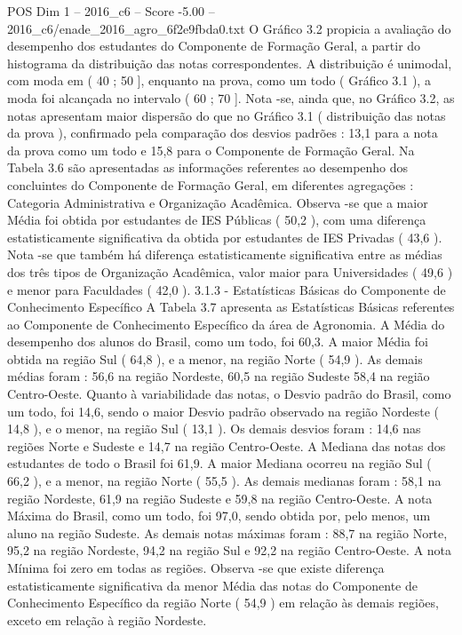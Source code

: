 \begin{textsample}{POS Dim 1 – 2016\_c6 – Score -5.00 – 2016\_c6/enade\_2016\_agro\_6f2e9fbda0.txt}
O Gráfico 3.2 propicia a avaliação do desempenho dos estudantes do Componente de Formação Geral, a partir do histograma da distribuição das notas correspondentes.
A distribuição é unimodal, com moda em ( 40 ; 50 ], enquanto na prova, como um todo ( Gráfico 3.1 ), a moda foi alcançada no intervalo ( 60 ; 70 ].
Nota -se, ainda que, no Gráfico 3.2, as notas apresentam maior dispersão do que no Gráfico 3.1 ( distribuição das notas da prova ), confirmado pela comparação dos desvios padrões : 13,1 para a nota da prova como um todo e 15,8 para o Componente de Formação Geral.
Na Tabela 3.6 são apresentadas as informações referentes ao desempenho dos concluintes do Componente de Formação Geral, em diferentes agregações : Categoria Administrativa e Organização Acadêmica.
Observa -se que a maior Média foi obtida por estudantes de IES Públicas ( 50,2 ), com uma diferença estatisticamente significativa da obtida por estudantes de IES Privadas ( 43,6 ).
Nota -se que também há diferença estatisticamente significativa entre as médias dos três tipos de Organização Acadêmica, valor maior para Universidades ( 49,6 ) e menor para Faculdades ( 42,0 ). 3.1.3 - Estatísticas Básicas do Componente de Conhecimento Específico A Tabela 3.7 apresenta as Estatísticas Básicas referentes ao Componente de Conhecimento Específico da área de Agronomia.
A Média do desempenho dos alunos do Brasil, como um todo, foi 60,3.
A maior Média foi obtida na região Sul ( 64,8 ), e a menor, na região Norte ( 54,9 ).
As demais médias foram : 56,6 na região Nordeste, 60,5 na região Sudeste 58,4 na região Centro-Oeste.
Quanto à variabilidade das notas, o Desvio padrão do Brasil, como um todo, foi 14,6, sendo o maior Desvio padrão observado na região Nordeste ( 14,8 ), e o menor, na região Sul ( 13,1 ).
Os demais desvios foram : 14,6 nas regiões Norte e Sudeste e 14,7 na região Centro-Oeste.
A Mediana das notas dos estudantes de todo o Brasil foi 61,9.
A maior Mediana ocorreu na região Sul ( 66,2 ), e a menor, na região Norte ( 55,5 ).
As demais medianas foram : 58,1 na região Nordeste, 61,9 na região Sudeste e 59,8 na região Centro-Oeste.
A nota Máxima do Brasil, como um todo, foi 97,0, sendo obtida por, pelo menos, um aluno na região Sudeste.
As demais notas máximas foram : 88,7 na região Norte, 95,2 na região Nordeste, 94,2 na região Sul e 92,2 na região Centro-Oeste.
A nota Mínima foi zero em todas as regiões.
Observa -se que existe diferença estatisticamente significativa da menor Média das notas do Componente de Conhecimento Específico da região Norte ( 54,9 ) em relação às demais regiões, exceto em relação à região Nordeste.

\end{textsample}
